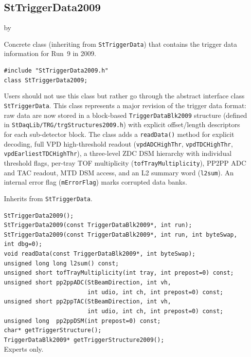 \documentclass[twoside]{article}
\newcommand{\entrylabel}[1]{\mbox{\textbf{{#1}}}\hfil}%
\newenvironment{entry}
{\begin{list}{}%
    {\renewcommand{\makelabel}{\entrylabel}%
     \setlength{\labelwidth}{90pt}%
     \setlength{\leftmargin}{\labelwidth}
     \advance\leftmargin by \labelsep%
      }%
    }%
  {\end{list}}
\newcommand{\Entrylabel}[1]%
{\raisebox{0pt}[1ex][0pt]{\makebox[\labelwidth][l]%
    {\parbox[t]{\labelwidth}{\hspace{0pt}\textbf{{#1}}}}}}
\newenvironment{Entry}%
{\renewcommand{\entrylabel}{\Entrylabel}\begin{entry}}%
  {\end{entry}}
\begin{document}
\subsection{StTriggerData2009}
\label{sec:StTriggerData2009}
\begin{Entry}
\item[Summary] Concrete class (inheriting from \texttt{StTriggerData}) that
    contains the trigger data information for Run~9 in 2009.
\item[Synopsis]
    \verb+#include "StTriggerData2009.h"+\\
    \verb+class StTriggerData2009;+\\
\item[Description] Users should not use this class but rather go through the
    abstract interface class \texttt{StTriggerData}.  This class represents a
    major revision of the trigger data format: raw data are now stored in a
    block-based \verb+TriggerDataBlk2009+ structure (defined in
    \texttt{StDaqLib/TRG/trgStructures2009.h}) with explicit offset/length
    descriptors for each sub-detector block.  The class adds a \verb+readData()+
    method for explicit decoding, full VPD high-threshold readout
    (\verb+vpdADCHighThr+, \verb+vpdTDCHighThr+, \verb+vpdEarliestTDCHighThr+),
    a three-level ZDC DSM hierarchy with individual threshold flags, per-tray TOF
    multiplicity (\verb+tofTrayMultiplicity+), PP2PP ADC and TAC readout, MTD DSM
    access, and an L2 summary word (\verb+l2sum+).  An internal error flag
    (\verb+mErrorFlag+) marks corrupted data banks.
\item[Related Classes] Inherits from \texttt{StTriggerData}.
\item[Public\\ Constructors]
    \verb+StTriggerData2009();+\\
    \verb+StTriggerData2009(const TriggerDataBlk2009*, int run);+\\
    \verb+StTriggerData2009(const TriggerDataBlk2009*, int run, int byteSwap, int dbg=0);+\\
    \verb+void readData(const TriggerDataBlk2009*, int byteSwap);+\\
    \verb+unsigned long long l2sum() const;+\\
    \verb+unsigned short tofTrayMultiplicity(int tray, int prepost=0) const;+\\

    \verb+unsigned short pp2ppADC(StBeamDirection, int vh,+\\
    \verb+                        int udio, int ch, int prepost=0) const;+\\
    \verb+unsigned short pp2ppTAC(StBeamDirection, int vh,+\\
    \verb+                        int udio, int ch, int prepost=0) const;+\\
    \verb+unsigned long  pp2ppDSM(int prepost=0) const;+\\
    \verb+char* getTriggerStructure();+\\
    \verb+TriggerDataBlk2009* getTriggerStructure2009();+\\
    Experts only.
\end{Entry}
\clearpage
\end{document}
